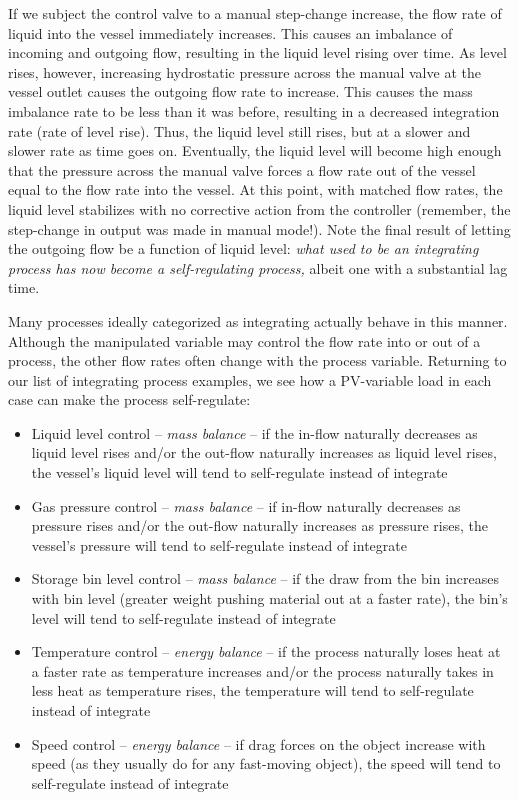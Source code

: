 If we subject the control valve to a manual step-change increase, the flow rate of liquid into the vessel immediately increases.  This causes an imbalance of incoming and outgoing flow, resulting in the liquid level rising over time.  As level rises, however, increasing hydrostatic pressure across the manual valve at the vessel outlet causes the outgoing flow rate to increase.  This causes the mass imbalance rate to be less than it was before, resulting in a decreased integration rate (rate of level rise).  Thus, the liquid level still rises, but at a slower and slower rate as time goes on.  Eventually, the liquid level will become high enough that the pressure across the manual valve forces a flow rate out of the vessel equal to the flow rate into the vessel.  At this point, with matched flow rates, the liquid level stabilizes with no corrective action from the controller (remember, the step-change in output was made in manual mode!).  Note the final result of letting the outgoing flow be a function of liquid level: \textit{what used to be an integrating process has now become a self-regulating process,} albeit one with a substantial lag time.

Many processes ideally categorized as integrating actually behave in this manner.  Although the manipulated variable may control the flow rate into or out of a process, the other flow rates often change with the process variable.  Returning to our list of integrating process examples, we see how a PV-variable load in each case can make the process self-regulate:

\begin{itemize}
\item Liquid level control -- \textit{mass balance} -- if the in-flow naturally decreases as liquid level rises and/or the out-flow naturally increases as liquid level rises, the vessel's liquid level will tend to self-regulate instead of integrate
\item Gas pressure control -- \textit{mass balance} -- if in-flow naturally decreases as pressure rises and/or the out-flow naturally increases as pressure rises, the vessel's pressure will tend to self-regulate instead of integrate
\item Storage bin level control -- \textit{mass balance} -- if the draw from the bin increases with bin level (greater weight pushing material out at a faster rate), the bin's level will tend to self-regulate instead of integrate
\item Temperature control -- \textit{energy balance} -- if the process naturally loses heat at a faster rate as temperature increases and/or the process naturally takes in less heat as temperature rises, the temperature will tend to self-regulate instead of integrate 
\item Speed control -- \textit{energy balance} -- if drag forces on the object increase with speed (as they usually do for any fast-moving object), the speed will tend to self-regulate instead of integrate
\end{itemize}

